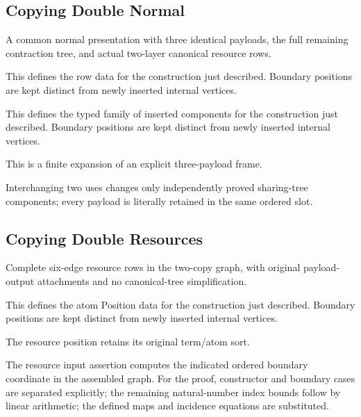 \subsection{Copying Double Normal}
A common normal presentation with three identical payloads, the full remaining contraction tree, and actual two-layer canonical resource rows.

This defines the row data for the construction just described. Boundary positions are kept distinct from newly inserted internal vertices.
\par{}

This defines the typed family of inserted components for the construction just described. Boundary positions are kept distinct from newly inserted internal vertices.
\par{}

This is a finite expansion of an explicit three-payload frame.
\par{}

Interchanging two uses changes only independently proved sharing-tree components; every payload is literally retained in the same ordered slot.
\par{}

\subsection{Copying Double Resources}
Complete six-edge resource rows in the two-copy graph, with original payload-output attachments and no canonical-tree simplification.

This defines the atom Position data for the construction just described. Boundary positions are kept distinct from newly inserted internal vertices.
\par{}

The resource position retains its original term/atom sort.
\par{}

The resource input assertion computes the indicated ordered boundary coordinate in the assembled graph.
For the proof, constructor and boundary cases are separated explicitly; the remaining natural-number index bounds follow by linear arithmetic; the defined maps and incidence equations are substituted.
\par{}

